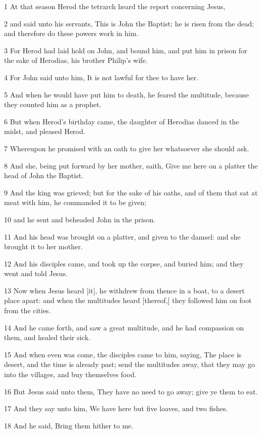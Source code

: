 \par 1 At that season Herod the tetrarch heard the report concerning Jesus,
\par 2 and said unto his servants, This is John the Baptist; he is risen from the dead; and therefore do these powers work in him.
\par 3 For Herod had laid hold on John, and bound him, and put him in prison for the sake of Herodias, his brother Philip's wife.
\par 4 For John said unto him, It is not lawful for thee to have her.
\par 5 And when he would have put him to death, he feared the multitude, because they counted him as a prophet.
\par 6 But when Herod's birthday came, the daughter of Herodias danced in the midst, and pleased Herod.
\par 7 Whereupon he promised with an oath to give her whatsoever she should ask.
\par 8 And she, being put forward by her mother, saith, Give me here on a platter the head of John the Baptist.
\par 9 And the king was grieved; but for the sake of his oaths, and of them that sat at meat with him, he commanded it to be given;
\par 10 and he sent and beheaded John in the prison.
\par 11 And his head was brought on a platter, and given to the damsel: and she brought it to her mother.
\par 12 And his disciples came, and took up the corpse, and buried him; and they went and told Jesus.
\par 13 Now when Jesus heard [it], he withdrew from thence in a boat, to a desert place apart: and when the multitudes heard [thereof,] they followed him on foot from the cities.
\par 14 And he came forth, and saw a great multitude, and he had compassion on them, and healed their sick.
\par 15 And when even was come, the disciples came to him, saying, The place is desert, and the time is already past; send the multitudes away, that they may go into the villages, and buy themselves food.
\par 16 But Jesus said unto them, They have no need to go away; give ye them to eat.
\par 17 And they say unto him, We have here but five loaves, and two fishes.
\par 18 And he said, Bring them hither to me.

